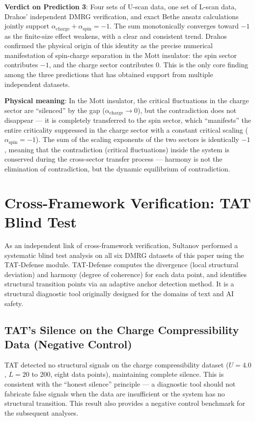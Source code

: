 \documentclass[prb,reprint,twocolumn,superscriptaddress]{revtex4-2}
\begin{document}
\textbf{Verdict on Prediction 3}: Four sets of U-scan data, one set of L-scan data, Drahos' independent DMRG verification, and exact Bethe ansatz calculations jointly support $\alpha_{\mathrm{charge}} + \alpha_{\mathrm{spin}} = -1$. The sum monotonically converges toward $-1$ as the finite-size effect weakens, with a clear and consistent trend. Drahos confirmed the physical origin of this identity as the precise numerical manifestation of spin-charge separation in the Mott insulator: the spin sector contributes $-1$, and the charge sector contributes $0$. This is the only core finding among the three predictions that has obtained support from multiple independent datasets.

\textbf{Physical meaning}: In the Mott insulator, the critical fluctuations in the charge sector are ``silenced'' by the gap ($\alpha_{\mathrm{charge}} \to 0$), but the contradiction does not disappear --- it is completely transferred to the spin sector, which ``manifests'' the entire criticality suppressed in the charge sector with a constant critical scaling ($\alpha_{\mathrm{spin}} = -1$). The sum of the scaling exponents of the two sectors is identically $-1$, meaning that the contradiction (critical fluctuations) inside the system is conserved during the cross-sector transfer process --- harmony is not the elimination of contradiction, but the dynamic equilibrium of contradiction.

\section{Cross-Framework Verification: TAT Blind Test}\label{sec:TAT}

As an independent link of cross-framework verification, Sultanov performed a systematic blind test analysis on all six DMRG datasets of this paper using the TAT-Defense module. TAT-Defense computes the divergence (local structural deviation) and harmony (degree of coherence) for each data point, and identifies structural transition points via an adaptive anchor detection method. It is a structural diagnostic tool originally designed for the domains of text and AI safety.

\subsection{TAT's Silence on the Charge Compressibility Data (Negative Control)}

TAT detected no structural signals on the charge compressibility dataset ($U=4.0$, $L=20$ to $200$, eight data points), maintaining complete silence. This is consistent with the ``honest silence'' principle --- a diagnostic tool should not fabricate false signals when the data are insufficient or the system has no structural transition. This result also provides a negative control benchmark for the subsequent analyses.
\end{document}
